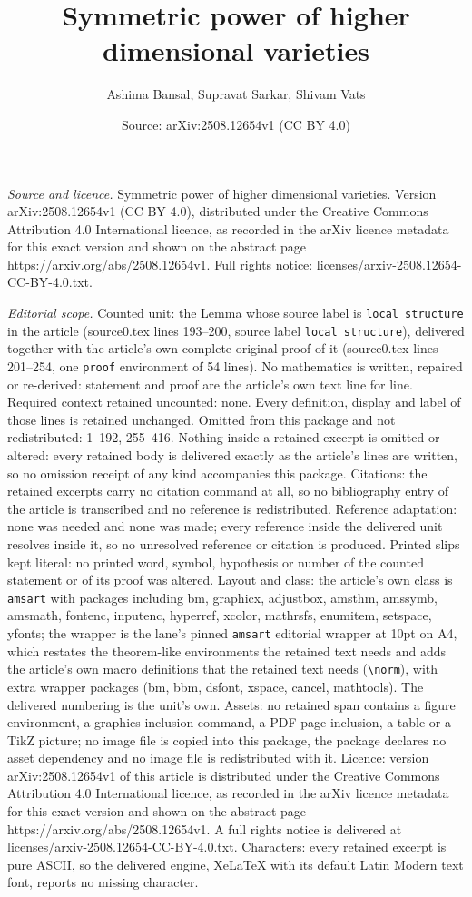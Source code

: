 \documentclass[10pt,a4paper]{amsart}
\title[Symmetric power of higher dimensional varieties]{Symmetric power of higher dimensional varieties}
\author{Ashima Bansal, Supravat Sarkar, Shivam Vats}
\date{Source: arXiv:2508.12654v1 (CC BY 4.0)}
\begin{document}
\maketitle

\noindent\emph{Source and licence.} Symmetric power of higher dimensional varieties. Version arXiv:2508.12654v1 (CC BY 4.0), distributed under the Creative Commons Attribution 4.0 International licence, as recorded in the arXiv licence metadata for this exact version and shown on the abstract page https://arxiv.org/abs/2508.12654v1. Full rights notice: licenses/arxiv-2508.12654-CC-BY-4.0.txt.\par\smallskip

\noindent\textit{Editorial scope.} Counted unit: the Lemma whose source label is \texttt{local structure} in the article (source0.tex lines 193--200, source label \texttt{local structure}), delivered together with the article's own complete original proof of it (source0.tex lines 201--254, one \texttt{proof} environment of 54 lines). No mathematics is written, repaired or re-derived: statement and proof are the article's own text line for line. Required context retained uncounted: none. Every definition, display and label of those lines is retained unchanged. Omitted from this package and not redistributed: 1--192, 255--416. Nothing inside a retained excerpt is omitted or altered: every retained body is delivered exactly as the article's lines are written, so no omission receipt of any kind accompanies this package. Citations: the retained excerpts carry no citation command at all, so no bibliography entry of the article is transcribed and no reference is redistributed. Reference adaptation: none was needed and none was made; every reference inside the delivered unit resolves inside it, so no unresolved reference or citation is produced. Printed slips kept literal: no printed word, symbol, hypothesis or number of the counted statement or of its proof was altered. Layout and class: the article's own class is \texttt{amsart} with packages including bm, graphicx, adjustbox, amsthm, amssymb, amsmath, fontenc, inputenc, hyperref, xcolor, mathrsfs, enumitem, setspace, yfonts; the wrapper is the lane's pinned \texttt{amsart} editorial wrapper at 10pt on A4, which restates the theorem-like environments the retained text needs and adds the article's own macro definitions that the retained text needs (\texttt{\textbackslash norm}), with extra wrapper packages (bm, bbm, dsfont, xspace, cancel, mathtools). The delivered numbering is the unit's own. Assets: no retained span contains a figure environment, a graphics-inclusion command, a PDF-page inclusion, a table or a TikZ picture; no image file is copied into this package, the package declares no asset dependency and no image file is redistributed with it. Licence: version arXiv:2508.12654v1 of this article is distributed under the Creative Commons Attribution 4.0 International licence, as recorded in the arXiv licence metadata for this exact version and shown on the abstract page https://arxiv.org/abs/2508.12654v1. A full rights notice is delivered at licenses/arxiv-2508.12654-CC-BY-4.0.txt. Characters: every retained excerpt is pure ASCII, so the delivered engine, XeLaTeX with its default Latin Modern text font, reports no missing character.
\end{document}
